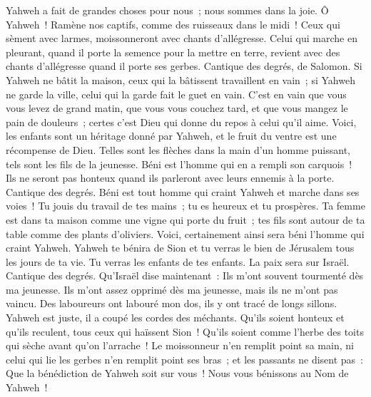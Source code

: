 \begin{multicols}{2}
Yahweh a fait de grandes choses pour nous~; nous sommes dans la joie.
Ô Yahweh~! Ramène nos captifs, comme des ruisseaux dans le midi~!
Ceux qui sèment avec larmes, moissonneront avec chants d'allégresse.
Celui qui marche en pleurant, quand il porte la semence pour la mettre en terre, revient avec des chants d'allégresse quand il porte ses gerbes.
\VerseOne{}Cantique des degrés, de Salomon. Si Yahweh ne bâtit la maison, ceux qui la bâtissent travaillent en vain~; si Yahweh ne garde la ville, celui qui la garde fait le guet en vain.
C'est en vain que vous vous levez de grand matin, que vous vous couchez tard, et que vous mangez le pain de douleurs~; certes c'est Dieu qui donne du repos à celui qu'il aime.
Voici, les enfants sont un héritage donné par Yahweh, et le fruit du ventre est une récompense de Dieu.
Telles sont les flèches dans la main d'un homme puissant, tels sont les fils de la jeunesse.
Béni est l'homme qui en a rempli son carquois~! Ils ne seront pas honteux quand ils parleront avec leurs ennemis à la porte.
\VerseOne{}Cantique des degrés. Béni est tout homme qui craint Yahweh et marche dans ses voies~!
Tu jouis du travail de tes mains~; tu es heureux et tu prospères.
Ta femme est dans ta maison comme une vigne qui porte du fruit~; tes fils sont autour de ta table comme des plants d'oliviers.
Voici, certainement ainsi sera béni l'homme qui craint Yahweh.
Yahweh te bénira de Sion et tu verras le bien de Jérusalem tous les jours de ta vie.
Tu verras les enfants de tes enfants. La paix sera sur Israël.
\VerseOne{}Cantique des degrés. Qu'Israël dise maintenant~: Ils m'ont souvent tourmenté dès ma jeunesse.
Ils m'ont assez opprimé dès ma jeunesse, mais ils ne m'ont pas vaincu.
Des laboureurs ont labouré mon dos, ils y ont tracé de longs sillons.
Yahweh est juste, il a coupé les cordes des méchants.
Qu'ils soient honteux et qu'ils reculent, tous ceux qui haïssent Sion~!
Qu'ils soient comme l'herbe des toits qui sèche avant qu'on l'arrache~!
Le moissonneur n'en remplit point sa main, ni celui qui lie les gerbes n'en remplit point ses bras~;
et les passants ne disent pas~: Que la bénédiction de Yahweh soit sur vous~! Nous vous bénissons au Nom de Yahweh~!

\end{multicols}
